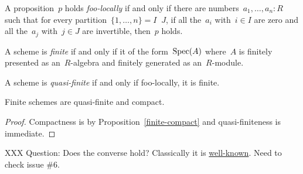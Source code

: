 
\begin{definition}A proposition~$p$ holds \emph{foo-locally} if and only if
there are numbers~$a_1,\ldots,a_n : R$ such that for every
partition~$\{1,\ldots,n\} = I \mathop{\dot\cup} J$, if all the~$a_i$ with~$i
\in I$ are zero and all the~$a_j$ with~$j \in J$ are invertible, then~$p$
holds.
\end{definition}

\begin{definition}A scheme is \emph{finite} if and only if it of the
form~$\operatorname{Spec}(A)$ where~$A$ is finitely presented as an~$R$-algebra and finitely
generated as an~$R$-module.\end{definition}

\begin{definition}A scheme is \emph{quasi-finite} if and only if foo-locally,
it is finite.
\end{definition}

\begin{proposition}Finite schemes are quasi-finite and
compact.\end{proposition}

\begin{proof}Compactness is by Proposition~\ref{finite-compact} and
quasi-finiteness is immediate.
\end{proof}

XXX Question: Does the converse hold? Classically it is
\href{https://math.stackexchange.com/questions/4674878/does-quasi-finite-and-\%C3\%A9tale-locally-closed-enough-to-imply-finite}{well-known}.
Need to check issue \#6.

